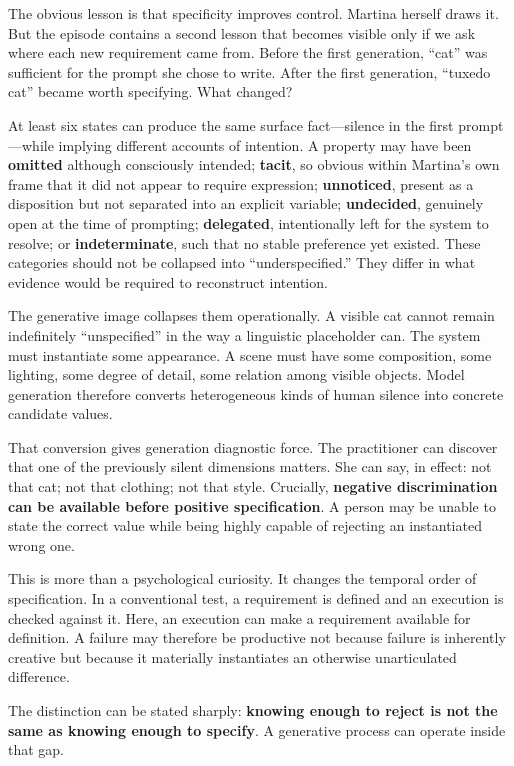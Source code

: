 \documentclass[
  11pt,
  letterpaper,
]{article}
\begin{document}
The obvious lesson is that specificity improves control. Martina herself
draws it. But the episode contains a second lesson that becomes visible
only if we ask where each new requirement came from. Before the first
generation, ``cat'' was sufficient for the prompt she chose to write.
After the first generation, ``tuxedo cat'' became worth specifying. What
changed?

At least six states can produce the same surface fact---silence in the
first prompt---while implying different accounts of intention. A
property may have been \textbf{omitted} although consciously intended;
\textbf{tacit}, so obvious within Martina's own frame that it did not
appear to require expression; \textbf{unnoticed}, present as a
disposition but not separated into an explicit variable;
\textbf{undecided}, genuinely open at the time of prompting;
\textbf{delegated}, intentionally left for the system to resolve; or
\textbf{indeterminate}, such that no stable preference yet existed.
These categories should not be collapsed into ``underspecified.'' They
differ in what evidence would be required to reconstruct intention.

The generative image collapses them operationally. A visible cat cannot
remain indefinitely ``unspecified'' in the way a linguistic placeholder
can. The system must instantiate some appearance. A scene must have some
composition, some lighting, some degree of detail, some relation among
visible objects. Model generation therefore converts heterogeneous kinds
of human silence into concrete candidate values.

That conversion gives generation diagnostic force. The practitioner can
discover that one of the previously silent dimensions matters. She can
say, in effect: not that cat; not that clothing; not that style.
Crucially, \textbf{negative discrimination can be available before
positive specification}. A person may be unable to state the correct
value while being highly capable of rejecting an instantiated wrong one.

This is more than a psychological curiosity. It changes the temporal
order of specification. In a conventional test, a requirement is defined
and an execution is checked against it. Here, an execution can make a
requirement available for definition. A failure may therefore be
productive not because failure is inherently creative but because it
materially instantiates an otherwise unarticulated difference.

The distinction can be stated sharply: \textbf{knowing enough to reject
is not the same as knowing enough to specify}. A generative process can
operate inside that gap.
\end{document}
